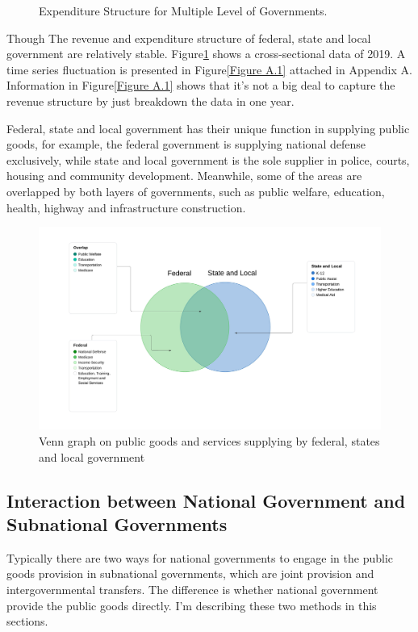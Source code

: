 \begin{figure}[H]
    \caption[Expenditure Structure for Multiple Level of Governments in 2019]{Expenditure Structure for Multiple Level of Governments.}    %
    \label{Figure 1.3}
\end{figure}

Though The revenue and expenditure structure of federal, state and local government are relatively stable. Figure\ref*{Figure 1.3} shows a cross-sectional data of 2019. A time series fluctuation is presented in Figure\ref*{Figure A.1} attached in Appendix A. Information in Figure\ref*{Figure A.1} shows that it's not a big deal to capture the revenue structure by just breakdown the data in one year.

Federal, state and local government has their unique function in supplying public goods, for example, the federal government is supplying national defense exclusively, while state and local government is the sole supplier in police, courts, housing and community development. Meanwhile, some of the areas are overlapped by both layers of governments, such as public welfare, education, health, highway and infrastructure construction.

\begin{figure}[H]
    \centering
    \includegraphics[scale=0.4]{Chapter-1/Figures/Venn graph on public goods.jpeg}
    \caption[Venn graph on public goods and services supplying]{Venn graph on public goods and services supplying by federal, states and local government
        \texttt{} }
    \label{Figure 1.4}
\end{figure}

\subsection{Interaction between National Government and Subnational Governments}
Typically there are two ways for national governments to engage in the public goods provision in subnational governments, which are joint provision and intergovernmental transfers. The difference is whether national government provide the public goods directly. I'm describing these two methods in this sections.

